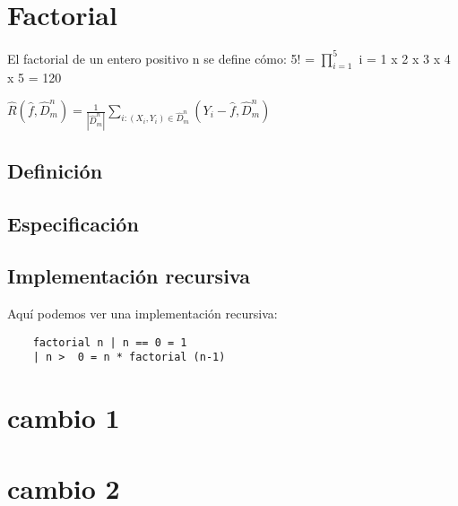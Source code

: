 \documentclass{article}
\begin{document}
\section{Factorial}


El factorial de un entero positivo n se define cómo: 5! = $\prod_{i=1}^{5}$ i = 1 x 2 x 3 x 4 x 5 = 120 


$\hat{R}(\hat{f}, \hat{D}_m^n ) = \frac{1}{|\hat{D}_m^n|} \sum_{i:(X_i, Y_i) \in \hat{D}_m^n }^{} (Y_i - \hat{f}, \hat{D}_m^n) $

\subsection{Definición}



\subsection{Especificación}


\subsection{Implementación recursiva}

Aquí podemos ver una implementación recursiva:

\begin{verbatim}
	factorial n | n == 0 = 1
	| n >  0 = n * factorial (n-1)
\end{verbatim}

\section{cambio 1}


\section{cambio 2}
\end{document}
